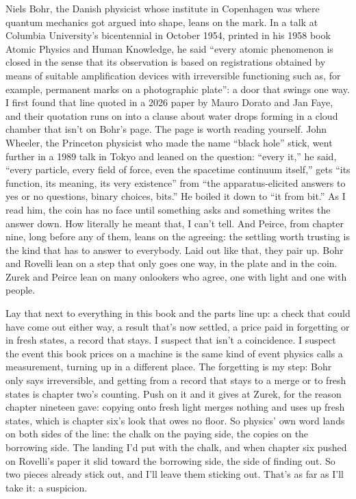 \documentclass[11pt,twoside]{article}
\theoremstyle{thielethm}
\theoremstyle{thieledef}
\theoremstyle{thieledef}
\theoremstyle{thieledef}
\theoremstyle{thielethm}
\theoremstyle{thieleobs}
\theoremstyle{thielethm}
\begin{document}
Niels Bohr, the Danish physicist whose institute in Copenhagen was where quantum mechanics got argued into shape, leans on the mark. In a talk at Columbia University's bicentennial in October 1954, printed in his 1958 book Atomic Physics and Human Knowledge, he said ``every atomic phenomenon is closed in the sense that its observation is based on registrations obtained by means of suitable amplification devices with irreversible functioning such as, for example, permanent marks on a photographic plate'': a door that swings one way. I first found that line quoted in a 2026 paper by Mauro Dorato and Jan Faye, and their quotation runs on into a clause about water drops forming in a cloud chamber that isn't on Bohr's page. The page is worth reading yourself. John Wheeler, the Princeton physicist who made the name ``black hole'' stick, went further in a 1989 talk in Tokyo and leaned on the question: ``every it,'' he said, ``every particle, every field of force, even the spacetime continuum itself,'' gets ``its function, its meaning, its very existence'' from ``the apparatus-elicited answers to yes or no questions, binary choices, bits.'' He boiled it down to ``it from bit.'' As I read him, the coin has no face until something asks and something writes the answer down. How literally he meant that, I can't tell. And Peirce, from chapter nine, long before any of them, leans on the agreeing: the settling worth trusting is the kind that has to answer to everybody. Laid out like that, they pair up. Bohr and Rovelli lean on a step that only goes one way, in the plate and in the coin. Zurek and Peirce lean on many onlookers who agree, one with light and one with people.

Lay that next to everything in this book and the parts line up: a check that could have come out either way, a result that's now settled, a price paid in forgetting or in fresh states, a record that stays. I suspect that isn't a coincidence. I suspect the event this book prices on a machine is the same kind of event physics calls a measurement, turning up in a different place. The forgetting is my step: Bohr only says irreversible, and getting from a record that stays to a merge or to fresh states is chapter two's counting. Push on it and it gives at Zurek, for the reason chapter nineteen gave: copying onto fresh light merges nothing and uses up fresh states, which is chapter six's look that owes no floor. So physics' own word lands on both sides of the line: the chalk on the paying side, the copies on the borrowing side. The landing I'd put with the chalk, and when chapter six pushed on Rovelli's paper it slid toward the borrowing side, the side of finding out. So two pieces already stick out, and I'll leave them sticking out. That's as far as I'll take it: a suspicion.
\end{document}

